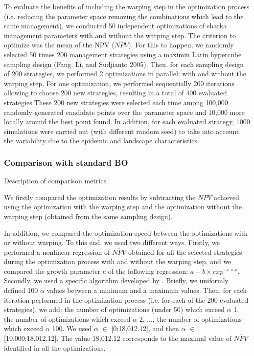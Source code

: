 To evaluate the benefits of including the warping step in the optimization process (i.e. reducing the parameter space removing the combinations which lead to the same management), we conducted 50 independent optimizations of sharka management parameters with and without the warping step. The criterion to optimize was the mean of the NPV ($\overline{NPV}$).
For this to happen, we randomly selected 50 times 200 management strategies using a maximin Latin hypercube sampling design (Fang, Li, and Sudjianto 2005). Then, for each sampling design of 200 strategies, we performed 2 optimizations in parallel: with and without the warping step. For one optimization, we performed sequentially 200 iterations allowing to choose 200 new strategies, resulting in a total of 400 evaluated strategies.These 200 new strategies were selected each time among 100,000 randomly generated candidate points over the parameter space and 10,000 more locally around the best point found. In addition, for each evaluated strategy, 1000 simulations were carried out (with different random seed) to take into account the variability due to the epidemic and landscape characteristics.

\subsubsection{Comparison with standard BO}

Description of comparison metrics



We firstly compared the optimization results by subtracting the $\overline{NPV}$ achieved using the optimization with the warping step and the optimization without the warping step (obtained from the same sampling design). 

In addition, we compared the optimization speed between the optimizations with or without warping. To this end, we used two different ways. Firstly, we performed a nonlinear regression of $\overline{NPV}$ obtained for all the selected strategies during the optimization process with and without the warping step, and we compared the growth parameter c of the following regression:
$a+b \times exp^{-c\times x}$.
Secondly, we used a specific algorithm developed by . Briefly, we uniformly defined 100 $\alpha$ values between a minimum and a maximum values. Then, for each iteration performed in the optimization process (i.e. for each of the 200 evaluated strategies), we add: the number of optimizations (under 50) which exceed $\alpha$ 1, the number of optimizations which exceed $\alpha$ 2, ..., the number of optimizations which exceed $\alpha$ 100. We used $\alpha$ $\in$ [0;18,012.12], and then $\alpha$ $\in$ [10,000;18,012.12]. The value 18,012.12 corresponds to the maximal value of $\overline{NPV}$ identified in all the optimizations.


